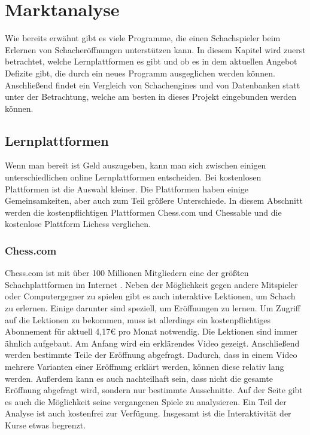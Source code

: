 
\chapter{Marktanalyse}\label{cp:marktanalyse}
Wie bereits erwähnt gibt es viele Programme, die einen Schachspieler beim Erlernen von Schacheröffnungen unterstützen kann. In diesem Kapitel wird zuerst betrachtet, welche Lernplattformen es gibt und ob es in dem aktuellen Angebot Defizite gibt, die durch ein neues Programm ausgeglichen werden können. Anschließend findet ein Vergleich von Schachengines und von Datenbanken statt unter der Betrachtung, welche am besten in dieses Projekt eingebunden werden können.


\section{Lernplattformen}
Wenn man bereit ist Geld auszugeben, kann man sich zwischen einigen unterschiedlichen online Lernplattformen entscheiden. Bei kostenlosen Plattformen ist die Auswahl kleiner. Die Plattformen haben einige Gemeinsamkeiten, aber auch zum Teil größere Unterschiede. In diesem Abschnitt werden die kostenpflichtigen Plattformen Chess.com und Chessable und die kostenlose Plattform Lichess verglichen.

\subsection{Chess.com}
Chess.com ist mit über 100 Millionen Mitgliedern eine der größten Schachplattformen im Internet \cite{chesscom_chesscom_2022}. Neben der Möglichkeit gegen andere Mitspieler oder Computergegner zu spielen gibt es auch interaktive Lektionen, um Schach zu erlernen. Einige darunter sind speziell, um Eröffnungen zu lernen. Um Zugriff auf die Lektionen zu bekommen, muss ist allerdings ein kostenpflichtiges Abonnement für aktuell 4,17€ pro Monat notwendig. Die Lektionen sind immer ähnlich aufgebaut. Am Anfang wird ein erklärendes Video gezeigt. Anschließend werden bestimmte Teile der Eröffnung abgefragt. Dadurch, dass in einem Video mehrere Varianten einer Eröffnung erklärt werden, können diese relativ lang werden. Außerdem kann es auch nachteilhaft sein, dass nicht die gesamte Eröffnung abgefragt wird, sondern nur bestimmte Ausschnitte. Auf der Seite gibt es auch die Möglichkeit seine vergangenen Spiele zu analysieren. Ein Teil der Analyse ist auch kostenfrei zur Verfügung. Insgesamt ist die Interaktivität der Kurse etwas begrenzt.

